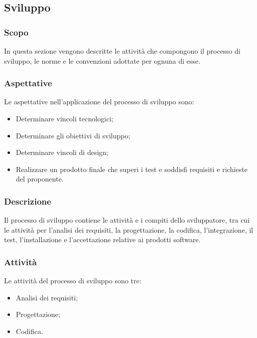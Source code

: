 \subsection{Sviluppo}
\subsubsection{Scopo}
In questa sezione vengono descritte le attività che compongono il processo di sviluppo, le norme e le convenzioni adottate per ognuna di esse.
\subsubsection{Aspettative}
Le aspettative nell'applicazione del processo di sviluppo sono:
\begin{itemize}
\item Determinare vincoli tecnologici;
\item Determinare gli obiettivi di sviluppo;
\item Determinare vincoli di design;
\item Realizzare un prodotto finale che superi i test e soddisfi requisiti e richieste del proponente.
\end{itemize}
\subsubsection{Descrizione}
Il processo di sviluppo contiene le attività e i compiti dello sviluppatore, tra cui le attività per l'analisi dei requisiti, la progettazione, la codifica, l'integrazione, il test, l'installazione e l'accettazione relative ai prodotti software. 
\subsubsection{Attività}
Le attività del processo di sviluppo sono tre:
\begin{itemize}
\item Analisi dei requisiti;
\item Progettazione;
\item Codifica.
\end{itemize}
